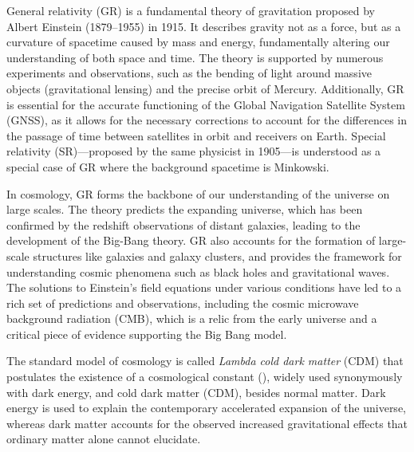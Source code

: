 






General relativity (GR) is a fundamental theory of gravitation proposed by Albert Einstein (1879--1955) in 1915. It describes gravity not as a force, but as a curvature of spacetime caused by mass and energy, fundamentally altering our understanding of both space and time. The theory is supported by numerous experiments and observations, such as the bending of light around massive objects (gravitational lensing) and the precise orbit of Mercury. Additionally, GR is essential for the accurate functioning of the Global Navigation Satellite System (GNSS), as it allows for the necessary corrections to account for the differences in the passage of time between satellites in orbit and receivers on Earth.
%
Special relativity (SR)---proposed by the same physicist in 1905---is understood as a special case of GR where the background spacetime is Minkowski. 
%


In cosmology, GR forms the backbone of our understanding of the universe on large scales. The theory predicts the expanding universe, which has been confirmed by the redshift observations of distant galaxies, leading to the development of the Big-Bang theory. GR also accounts for the formation of large-scale structures like galaxies and galaxy clusters, and provides the framework for understanding cosmic phenomena such as black holes and gravitational waves. The solutions to Einstein's field equations under various conditions have led to a rich set of predictions and observations, including the cosmic microwave background radiation (CMB), which is a relic from the early universe and a critical piece of evidence supporting the Big Bang model.



The standard model of cosmology is called \textit{Lambda cold dark matter} (\textLambda{}CDM) that postulates the existence of a cosmological constant (\textLambda{}), widely used synonymously with dark energy, and cold dark matter (CDM), besides normal matter. Dark energy is used to explain the contemporary accelerated expansion of the universe, whereas dark matter accounts for the observed increased gravitational effects that ordinary matter alone cannot elucidate. %


